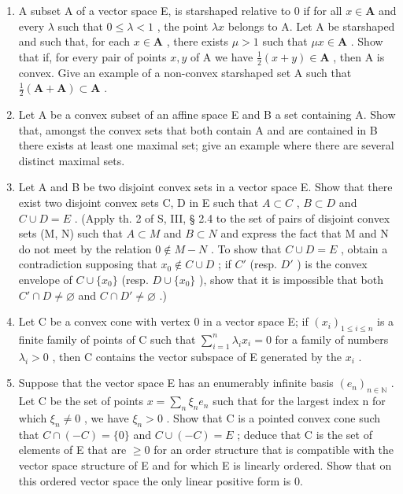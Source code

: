 \setcounter{exercisegroup}{1}
\exercisegroup

\begin{enumerate}
\def\labelenumi{\arabic{enumi})}
\item
  A subset A of a vector space E, is starshaped relative to 0 if for all \(x \in \mathbf{A}\) and every \(\lambda\) such that \(0 \leqslant \lambda < 1\) , the point \(\lambda x\) belongs to A. Let A be starshaped and such that, for each \(x \in \mathbf{A}\) , there exists \(\mu > 1\) such that \(\mu x \in \mathbf{A}\) . Show that if, for every pair of points \(x, y\) of A we have \(\frac{1}{2}(x + y) \in \mathbf{A}\) , then A is convex. Give an example of a non-convex starshaped set A such that \(\frac{1}{2}(\mathbf{A} + \mathbf{A}) \subset \mathbf{A}\) .
\item
  Let A be a convex subset of an affine space E and B a set containing A. Show that, amongst the convex sets that both contain A and are contained in B there exists at least one maximal set; give an example where there are several distinct maximal sets.
\item
  Let A and B be two disjoint convex sets in a vector space E. Show that there exist two disjoint convex sets C, D in E such that \(A \subset C\) , \(B \subset D\) and \(C \cup D = E\) . (Apply th. 2 of S, III, § 2.4 to the set of pairs of disjoint convex sets (M, N) such that \(A \subset M\) and \(B \subset N\) and express the fact that M and N do not meet by the relation \(0 \notin M - N\) . To show that \(C \cup D = E\) , obtain a contradiction supposing that \(x_{0} \notin C \cup D\) ; if \(C'\) (resp. \(D'\) ) is the convex envelope of \(C \cup \{x_{0}\}\) (resp. \(D \cup \{x_{0}\}\) ), show that it is impossible that both \(C' \cap D \neq \varnothing\) and \(C \cap D' \neq \varnothing\) .)
\item
  Let C be a convex cone with vertex 0 in a vector space E; if \((x_{i})_{1\leqslant i\leqslant n}\) is a finite family of points of C such that \(\sum_{i = 1}^{n}\lambda_{i}x_{i} = 0\) for a family of numbers \(\lambda_{i} > 0\) , then C contains the vector subspace of E generated by the \(x_{i}\) .
\item
  Suppose that the vector space E has an enumerably infinite basis \((e_{n})_{n\in\mathbb{N}}\) . Let C be the set of points \(x = \sum_{n} \xi_{n} e_{n}\) such that for the largest index n for which \(\xi_{n} \neq 0\) , we have \(\xi_{n} > 0\) . Show that C is a pointed convex cone such that \(C \cap (-C) = \{0\}\) and \(C \cup (-C) = E\) ; deduce that C is the set of elements of E that are \(\geqslant 0\) for an order structure that is compatible with the vector space structure of E and for which E is linearly ordered. Show that on this ordered vector space the only linear positive form is 0.

\end{enumerate}
